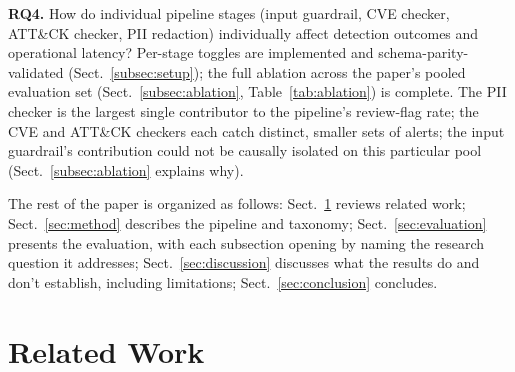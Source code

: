 \documentclass[pdflatex,sn-mathphys-num]{sn-jnl}%
\begin{document}
\textbf{RQ4.} How do individual pipeline stages (input guardrail, CVE
checker, ATT\&CK checker, PII redaction) individually affect detection
outcomes and operational latency? Per-stage toggles are implemented and
schema-parity-validated (Sect.~\ref{subsec:setup}); the full ablation
across the paper's pooled evaluation set (Sect.~\ref{subsec:ablation},
Table~\ref{tab:ablation}) is complete. The PII checker is the largest
single contributor to the pipeline's review-flag rate; the CVE and
ATT\&CK checkers each catch distinct, smaller sets of alerts; the input
guardrail's contribution could not be causally isolated on this
particular pool (Sect.~\ref{subsec:ablation} explains why).

The rest of the paper is organized as follows: Sect.~\ref{sec:related-work}
reviews related work; Sect.~\ref{sec:method} describes the pipeline and
taxonomy; Sect.~\ref{sec:evaluation} presents the evaluation, with each
subsection opening by naming the research question it addresses;
Sect.~\ref{sec:discussion} discusses what the results do and don't
establish, including limitations; Sect.~\ref{sec:conclusion} concludes.

\section{Related Work}\label{sec:related-work}
\end{document}
